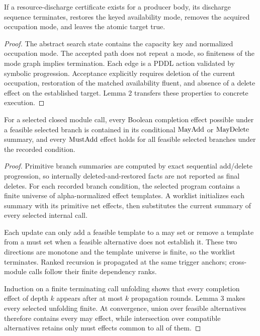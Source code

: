 \begin{lemma}
If a resource-discharge certificate exists for a producer body, its discharge
sequence terminates, restores the keyed availability mode, removes the acquired
occupation mode, and leaves the atomic target true.
\end{lemma}

\begin{proof}
The abstract search state contains the capacity key and normalized occupation
mode. The accepted path does not repeat a mode, so finiteness of the mode graph
implies termination. Each edge is a PDDL action validated by symbolic
progression. Acceptance explicitly requires deletion of the current occupation,
restoration of the matched availability fluent, and absence of a delete effect
on the established target. Lemma 2 transfers these properties to concrete
execution.
\end{proof}

\begin{lemma}
For a selected closed module call, every Boolean completion effect possible
under a feasible selected branch is contained in its conditional $\mathrm{MayAdd}$ or
$\mathrm{MayDelete}$ summary, and every $\mathrm{MustAdd}$ effect holds for all feasible selected
branches under the recorded condition.
\end{lemma}

\begin{proof}
Primitive branch summaries are computed by exact sequential add/delete
progression, so internally deleted-and-restored facts are not reported as final
deletes. For each recorded branch condition, the selected program contains a
finite universe of alpha-normalized effect templates. A worklist initializes
each summary with its primitive net effects, then substitutes the current
summary of every selected internal call.

Each update can only add a feasible template to a may set or remove a template
from a must set when a feasible alternative does not establish it. These two
directions are monotone and the template universe is finite, so the worklist
terminates. Ranked recursion is propagated at the same trigger anchors;
cross-module calls follow their finite dependency ranks.

Induction on a finite terminating call unfolding shows that every completion
effect of depth $k$ appears after at most $k$ propagation rounds. Lemma 3 makes
every selected unfolding finite. At convergence, union over feasible
alternatives therefore contains every may effect, while intersection over
compatible alternatives retains only must effects common to all of them.
\end{proof}


